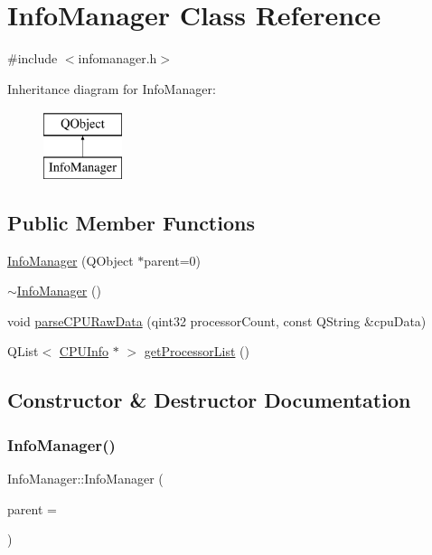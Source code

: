 \hypertarget{class_info_manager}{}\section{Info\+Manager Class Reference}
\label{class_info_manager}


{\ttfamily \#include $<$infomanager.\+h$>$}

Inheritance diagram for Info\+Manager\+:\begin{figure}[H]
\begin{center}
\leavevmode
\includegraphics[height=2.000000cm]{class_info_manager}
\end{center}
\end{figure}
\subsection*{Public Member Functions}
\begin{DoxyCompactItemize}
\item 
\hyperlink{class_info_manager_abdddbbf624c1fb9a3815b1e720bca72a}{Info\+Manager} (Q\+Object $\ast$parent=0)
\item 
\hyperlink{class_info_manager_ae53b7e0f0a345170596d6e17198261bf}{$\sim$\+Info\+Manager} ()
\item 
void \hyperlink{class_info_manager_a13e29dc9ebb100b5ab8b640207f4401c}{parse\+C\+P\+U\+Raw\+Data} (qint32 processor\+Count, const Q\+String \&cpu\+Data)
\item 
Q\+List$<$ \hyperlink{class_c_p_u_info}{C\+P\+U\+Info} $\ast$ $>$ \hyperlink{class_info_manager_af5c7c292bc2e1b13b4ef8fb441b2ca2b}{get\+Processor\+List} ()
\end{DoxyCompactItemize}


\subsection{Constructor \& Destructor Documentation}
\mbox{\label{class_info_manager_abdddbbf624c1fb9a3815b1e720bca72a}} 
\subsubsection{\texorpdfstring{Info\+Manager()}{InfoManager()}}
{\footnotesize\ttfamily Info\+Manager\+::\+Info\+Manager (\begin{DoxyParamCaption}\item[{Q\+Object $\ast$}]{parent = {} }\end{DoxyParamCaption})\hspace{0.3cm}{\ttfamily [explicit]}}

